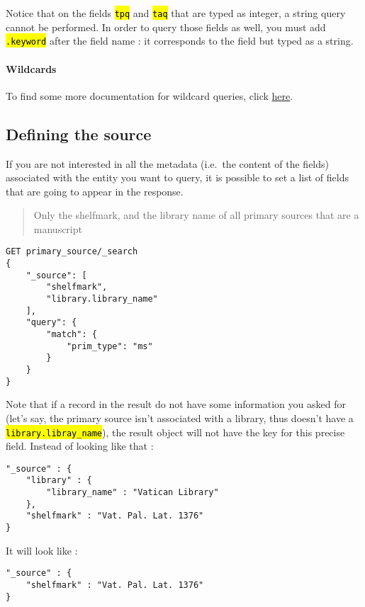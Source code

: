 \documentclass[a4paper,12pt]{article}
\let\OldTexttt\texttt
\renewcommand{\texttt}[1]{\OldTexttt{\hl{#1}}}
\begin{document}
Notice that on the fields \texttt{tpq} and \texttt{taq} that are typed as integer, a string query cannot be performed. In order to query those fields as well, you must add \texttt{.keyword} after the field name : it corresponds to the field but typed as a string.

\paragraph{Wildcards}\label{wildcards}

To find some more documentation for wildcard queries, click \href{https://www.elastic.co/guide/en/elasticsearch/reference/current/query-dsl-wildcard-query.html}{here}.

\subsection{Defining the source}\label{defining-the-source}

If you are not interested in all the metadata (i.e.~the content of the fields) associated with the entity you want to query, it is possible to set a list of fields that are going to appear in the response.

\begin{quote}
Only the shelfmark, and the library name of all primary sources that are a manuscript
\end{quote}

\begin{lstlisting}
GET primary_source/_search
{
    "_source": [
        "shelfmark",
        "library.library_name"
    ],
    "query": {
        "match": {
            "prim_type": "ms"
        }
    }
}
\end{lstlisting}

Note that if a record in the result do not have some information you asked for (let's say, the primary source isn't associated with a library, thus doesn't have a \texttt{library.libray\_name}), the result object will not have the key for this precise field. Instead of looking like that :

\begin{lstlisting}
"_source" : {
    "library" : {
        "library_name" : "Vatican Library"
    },
    "shelfmark" : "Vat. Pal. Lat. 1376"
}
\end{lstlisting}

It will look like :

\begin{lstlisting}
"_source" : {
    "shelfmark" : "Vat. Pal. Lat. 1376"
}
\end{lstlisting}
\end{document}
